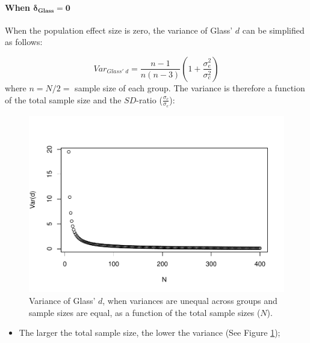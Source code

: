 \documentclass[
  english,
  man,mask]{apa6}
\providecommand{\tightlist}{%
  \setlength{\itemsep}{0pt}\setlength{\parskip}{0pt}}
\let\oldparagraph\paragraph
\renewcommand{\paragraph}[1]{\oldparagraph{#1}\mbox{}}
\begin{document}
\hypertarget{when-bmdelta_glass-0}{%
\paragraph{\texorpdfstring{When \(\bm{\delta_{Glass} = 0}\)}{When \textbackslash bm\{\textbackslash delta\_\{Glass\} = 0\}}}\label{when-bmdelta_glass-0}}

When the population effect size is zero, the variance of Glass' \(d\) can be simplified as follows:

\[Var_{Glass' \; d} = \frac{n-1}{n(n-3)} \left( 1+\frac{\sigma^2_e}{\sigma^2_c}\right)\]
where \(n=N/2=\) sample size of each group. The variance is therefore a function of the total sample size and the \(SD\)-ratio (\(\frac{\sigma_c}{\sigma_e}\)):

\begin{figure}
\centering
\includegraphics{Theoretical-Variance-of-all-estimators-as-a-function-of-population-parameters_files/figure-latex/varglassHetbalNsize2-1.pdf}
\caption{\label{fig:varglassHetbalNsize2}Variance of Glass' \(d\), when variances are unequal across groups and sample sizes are equal, as a function of the total sample sizes (\(N\)).}
\end{figure}

\begin{itemize}
\tightlist
\item
  The larger the total sample size, the lower the variance (See Figure \ref{fig:varglassHetbalNsize2});
\end{itemize}
\end{document}
